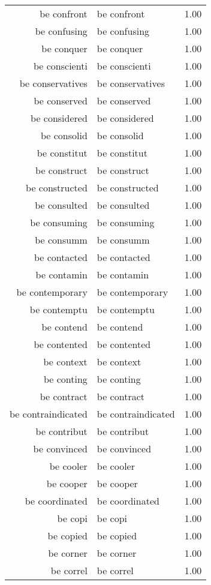 \begin{table}[ht]
\begin{tabular}{rlr}
  be confront & be confront & 1.00 \\ 
  be confusing & be confusing & 1.00 \\ 
  be conquer & be conquer & 1.00 \\ 
  be conscienti & be conscienti & 1.00 \\ 
  be conservatives & be conservatives & 1.00 \\ 
  be conserved & be conserved & 1.00 \\ 
  be considered & be considered & 1.00 \\ 
  be consolid & be consolid & 1.00 \\ 
  be constitut & be constitut & 1.00 \\ 
  be construct & be construct & 1.00 \\ 
  be constructed & be constructed & 1.00 \\ 
  be consulted & be consulted & 1.00 \\ 
  be consuming & be consuming & 1.00 \\ 
  be consumm & be consumm & 1.00 \\ 
  be contacted & be contacted & 1.00 \\ 
  be contamin & be contamin & 1.00 \\ 
  be contemporary & be contemporary & 1.00 \\ 
  be contemptu & be contemptu & 1.00 \\ 
  be contend & be contend & 1.00 \\ 
  be contented & be contented & 1.00 \\ 
  be context & be context & 1.00 \\ 
  be conting & be conting & 1.00 \\ 
  be contract & be contract & 1.00 \\ 
  be contraindicated & be contraindicated & 1.00 \\ 
  be contribut & be contribut & 1.00 \\ 
  be convinced & be convinced & 1.00 \\ 
  be cooler & be cooler & 1.00 \\ 
  be cooper & be cooper & 1.00 \\ 
  be coordinated & be coordinated & 1.00 \\ 
  be copi & be copi & 1.00 \\ 
  be copied & be copied & 1.00 \\ 
  be corner & be corner & 1.00 \\ 
  be correl & be correl & 1.00 \\ 

\end{tabular}
\end{table}
